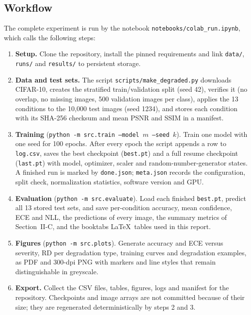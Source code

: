 \documentclass[conference]{IEEEtran}
\begin{document}
\subsection{Workflow}
The complete experiment is run by the notebook \texttt{notebooks/colab\_run.ipynb}, which calls the following steps:
\begin{enumerate}
\item \textbf{Setup.} Clone the repository, install the pinned requirements and link \texttt{data/}, \texttt{runs/} and \texttt{results/} to persistent storage.
\item \textbf{Data and test sets.} The script \texttt{scripts/make\_degraded.py} downloads CIFAR-10, creates the stratified train/validation split (seed 42), verifies it (no overlap, no missing images, 500 validation images per class), applies the 13 conditions to the 10{,}000 test images (seed 1234), and stores each condition with its SHA-256 checksum and mean PSNR and SSIM in a manifest.
\item \textbf{Training} (\texttt{python -m src.train --model $m$ --seed $k$}). Train one model with one seed for 100 epochs. After every epoch the script appends a row to \texttt{log.csv}, saves the best checkpoint (\texttt{best.pt}) and a full resume checkpoint (\texttt{last.pt}) with model, optimizer, scaler and random-number-generator states. A finished run is marked by \texttt{done.json}; \texttt{meta.json} records the configuration, split check, normalization statistics, software version and GPU.
\item \textbf{Evaluation} (\texttt{python -m src.evaluate}). Load each finished \texttt{best.pt}, predict all 13 stored test sets, and save per-condition accuracy, mean confidence, ECE and NLL, the predictions of every image, the summary metrics of Section~II-C, and the booktabs \LaTeX\ tables used in this report.
\item \textbf{Figures} (\texttt{python -m src.plots}). Generate accuracy and ECE versus severity, RD per degradation type, training curves and degradation examples, as PDF and 300-dpi PNG with markers and line styles that remain distinguishable in greyscale.
\item \textbf{Export.} Collect the CSV files, tables, figures, logs and manifest for the repository. Checkpoints and image arrays are not committed because of their size; they are regenerated deterministically by steps 2 and 3.
\end{enumerate}

\end{document}
